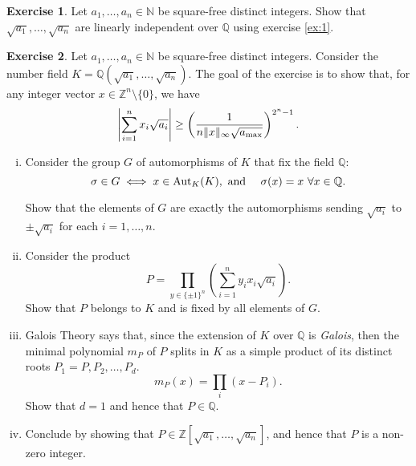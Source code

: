 \documentclass[12pt,a4paper]{article}
\theoremstyle{plain}
\newtheorem*{Sol*}{Solution}
\theoremstyle{definition}
\newtheorem{Ex}{Exercise}
\def \N {\mathbb N}
\def \Q {\mathbb Q}
\def \Z {\mathbb Z}
\newif\ifsolutions
\newcommand{\exercise}[2]{
			\begin{Ex} #1 \end{Ex}
			\ifsolutions  \begin{Sol*} #2 \end{Sol*} \bigskip \else \bigskip  \fi
		}
\begin{document}
\exercise{
	Let $a_1, \dots, a_n \in \N$ be square-free distinct integers. Show that $\sqrt{a_1}, \dots, \sqrt{a_n}$ are linearly independent over $\Q$ using exercise \ref{ex:1}.
}{}

\exercise{
	Let $a_1, \dots, a_n \in \N$ be square-free distinct integers. 
	Consider the number field $K = \Q(\sqrt{a_1}, \dots, \sqrt{a_n})$.
	The goal of the exercise is to show that, for any integer vector $x \in \Z^n \setminus \{ 0 \}$, we have
		\[ \left| \sum_{i=1}^n x_i \sqrt{a_i}  \right| \geq \left( \frac{1}{n \| x \|_\infty \sqrt{a_{\rm max}} } \right)^{2^n - 1}. \]

	\begin{enumerate}[i)]
		\item 
		Consider the group $G$ of automorphisms of $K$ that fix the field $\Q$:
			\[ \sigma \in G \iff x\in{\rm Aut}_K(K), \text{ and } \quad \sigma(x) = x \ \forall x \in \Q.\]

		Show that the elements of $G$ are exactly the automorphisms sending $\sqrt{a_i}$ to $\pm \sqrt{a_i}$ for each $i=1, \dots, n$.

		\item Consider the product 
			\[ P = \prod_{y \in \{ \pm 1\}^n} \left( \sum_{i=1}^n y_i x_i \sqrt{a_i} \right). \]
		Show that $P$ belongs to $K$ and is fixed by all elements of $G$.

		\item Galois Theory says  that, since the extension of $K$ over $\Q$ is \emph{Galois}, then the minimal polynomial $m_P$ of $P$ splits in $K$ as a simple product of its distinct roots $P_1=P, P_2, \dots, P_d$.
			\[ m_P(x) = \prod_i \left(x - P_i \right). \]
		Show that $d=1$ and hence that $P \in \Q$.

		\item Conclude by showing that $P \in \Z[\sqrt{a_1}, \dots, \sqrt{a_n}]$, and hence that $P$ is a non-zero integer.
	\end{enumerate}
}{}
\end{document}
